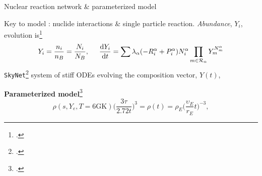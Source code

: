 \begin{frame}{Nuclear reaction network \& parameterized model}

    Key to model \nuc{}: nuclide interactions \& single particle reaction. %
    \textit{Abundance}, $Y_i$, evolution is\footcite{Hix:1999}%
    \begin{equation*}
    Y_i = \frac{n_i}{n_B} = \frac{N_i}{N_B}, \hspace{5mm}
    \frac{\text{d}Y_i}{\text{d}t} = \sum\lambda_{\alpha}(-R_{i}^{\alpha}+P_{i}^{\alpha})N_{i}^{\alpha}\prod_{m\in\mathcal{R}_{\alpha}}Y_m^{N_{m}^{\alpha}}
    \end{equation*}
    \texttt{SkyNet}\footcite{Lippuner:2015gwa}%
    system of stiff \acp{ODE} %
    evolving the composition vector, $Y(t)$, %
    
    \textbf{Parameterized model}\footcite{Lippuner:2015gwa,Radice:2018pdn}%
    \begin{equation*}
        \rho(s, Y_e, T=6\text{GK})\Big(\frac{3\tau}{2.72 t}\Big)^3 = \rho(t) = \rho_E\Big(\frac{\upsilon_E}{r_E}t\Big)^{-3},
    \end{equation*}
    

\end{frame}
